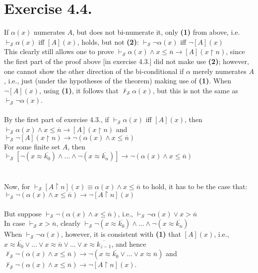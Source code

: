 \documentclass{article}
\begin{document}
\section*{Exercise 4.4.}
If $\alpha(x)$ numerates $A$, but does not bi-numerate it, only \textbf{(1)} from above, i.e. $\vdash_{\mathscr{S}} \alpha(x)$  iff  $[A](x)$, holds, but not \textbf{(2)}: $\vdash_{\mathscr{S}} \neg\alpha(x)$  iff  $\neg[A](x)$\\This clearly still allows one to prove $\vdash_{\mathscr{S}} \alpha(x) \wedge x \leq \overline{n} \rightarrow [A](x\upharpoonright n)$, since the first part of the proof above [in exercise 4.3.] did not make use \textbf{(2)}; however, one cannot show the other direction of the bi-conditional if $\alpha$ merely numerates $A$, i.e., just (under the hypotheses of the theorem) making use of \textbf{(1)}. When $\neg[A](x)$, using \textbf{(1)}, it follows that $\nvdash_{\mathscr{S}} \alpha(x)$, but this is not the same as $\vdash_{\mathscr{S}} \neg\alpha(x)$.\\\\
By the first part of exercise 4.3., if $\vdash_{\mathscr{S}} \alpha(x)$  iff  $[A](x)$, then\\
$\vdash_{\mathscr{S}} \alpha(x) \wedge x \leq \overline{n} \rightarrow [A](x\upharpoonright n)$ and $\vdash_{\mathscr{S}} \neg[A](x\upharpoonright n)  \rightarrow \neg(\alpha(x) \wedge x \leq \overline{n})$\\ For some finite set $A$, then $\vdash_{\mathscr{S}} [\neg (x \approx \overline{k_0}) \wedge . . . \wedge \neg(x \approx \overline{k_{n}})] \rightarrow \neg(\alpha(x) \wedge x \leq \overline{n})$
\\\\\\Now, for $\vdash_{\mathscr{S}} [A\upharpoonright n](x) \equiv \alpha(x) \wedge x \leq \overline{n}$ to hold, it has to be the case that:\\
$\vdash_{\mathscr{S}} \neg(\alpha(x) \wedge x \leq \overline{n}) \rightarrow \neg[A\upharpoonright n](x)$\\\\
But suppose $\vdash_{\mathscr{S}} \neg(\alpha(x) \wedge x \leq \overline{n})$, i.e., $\vdash_{\mathscr{S}} \neg\alpha(x) \vee x > \overline{n}$\\
In case $\vdash_{\mathscr{S}} x > \overline{n}$, clearly $\vdash_{\mathscr{S}}\neg (x \approx \overline{k_0}) \wedge . . . \wedge \neg(x \approx \overline{k_{n}})$\\
When $\vdash_{\mathscr{S}} \neg\alpha(x)$, however, it is consistent with \textbf{(1)} that $[A](x)$, i.e., \\$x \approx \overline{k_0} \vee . . . \vee x \approx \overline{n}\vee... \vee x \approx \overline{k_{z - 1}}$, and hence \\
$\nvdash_{\mathscr{S}} \neg(\alpha(x) \wedge x \leq \overline{n}) \rightarrow \neg(x \approx \overline{k_0} \vee . . . \vee x \approx \overline{n})$ and\\ $\nvdash_{\mathscr{S}} \neg(\alpha(x) \wedge x \leq \overline{n}) \rightarrow \neg[A\upharpoonright n](x)$.
\end{document}
